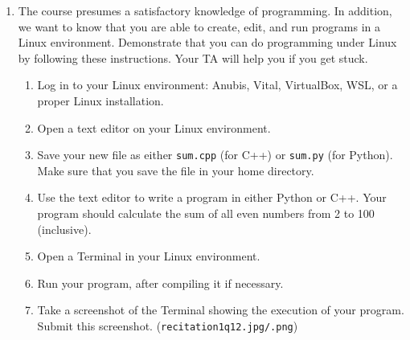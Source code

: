 \documentclass{article}
\begin{document}
\begin{enumerate}
    \item The course presumes a satisfactory knowledge of programming. In addition, we want to know that you are able to create, edit, and run programs in a Linux environment. Demonstrate that you can do programming under Linux by following these instructions. Your TA will help you if you get stuck.
    \begin{enumerate}
        \item Log in to your Linux environment: Anubis, Vital, VirtualBox, WSL, or a proper Linux installation.
        \item Open a text editor on your Linux environment.
        \item Save your new file as either \texttt{sum.cpp} (for C++) or \texttt{sum.py} (for Python). Make sure that you save the file in your home directory.
        \item Use the text editor to write a program in either Python or C++. Your program should calculate the sum of all even numbers from 2 to 100 (inclusive).
        \item Open a Terminal in your Linux environment.
        \item Run your program, after compiling it if necessary.
        \item Take a screenshot of the Terminal showing the execution of your program. Submit this screenshot. (\texttt{recitation1q12.jpg/.png})
    \end{enumerate}
\end{enumerate}
\end{document}
